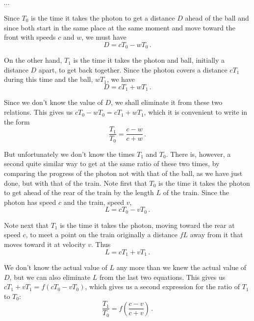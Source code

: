 $\cdots$

Since $T_0$ is the time it takes the photon to get a distance $D$ ahead of the ball and since both start in the same place at the same moment and move toward the front with speeds $c$ and $w$, we must have 
\begin{equation}\label{eq:Morin_04.5}
D = c T_0 - w T_0\,.
\end{equation}

On the other hand, $T_1$ is the time it takes the photon and ball, initially a distance $D$ apart, to get back together. Since the photon covers a distance $c T_1$ during this time and the ball, $w T_1$, we have 
\begin{equation}\label{eq:Morin_04.6}
D = c T_1 + w T_1\,.
\end{equation}

Since we don't know the value of $D$, we shall eliminate it from these two relations. 
This gives us $c T_0 - w T_0 = c T_1 + w T_1$, which it is convenient to write in the form
\begin{equation}\label{eq:Morin_04.7}
\frac{T_1}{T_0} = \frac{c - w}{c + w} \,.
\end{equation}

But unfortunately we don't know the times $T_1$ and $T_0$. There is, however, a second quite similar way to get at the same ratio of these two times, by comparing the progress of the photon not with that of the ball, as we have just done, but with that of the train. Note first that $T_0$ is the time it takes the photon to get ahead of the rear of the train by the length $L$ of the train. Since the photon has speed $c$ and the train, speed $v$, 
\begin{equation}\label{eq:Morin_04.8}
L = c T_0 - v T_0 \,.
\end{equation}

Note next that $T_1$ is the time it takes the photon, moving toward the rear at speed $c$, to meet a point on the train originally a distance $f L$ away from it that moves toward it at velocity $v$. Thus 
\begin{equation}\label{eq:Morin_04.9}
L = c T_1 + v T_1 \,.
\end{equation}

We don't know the actual value of $L$ any more than we knew the actual value of $D$, but we can also eliminate $L$ from the last two equations. This gives us $c T_1 + v T_1 = f (c T_0 - v T_0)$, which gives us a second expression for the ratio of $T_1$ to $T_0$:
\begin{equation}\label{eq:Morin_04.10}
\frac{T_1}{T_0} = f \left( \frac{c - v}{c + v}  \right) \,.
\end{equation}

